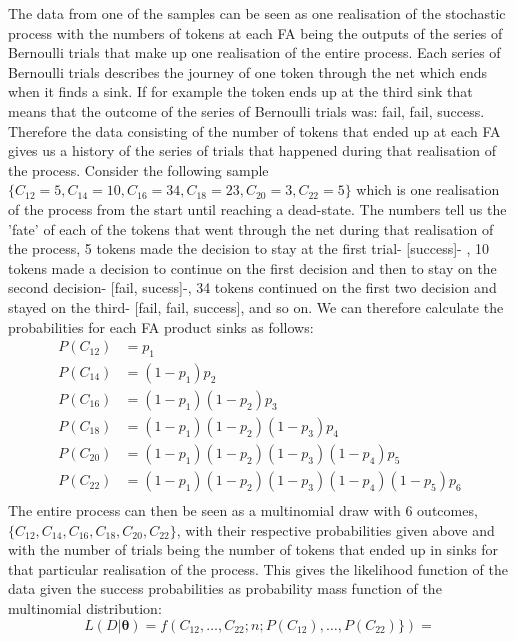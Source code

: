 The data from one of the samples can be seen as one realisation of the
stochastic process with the numbers of tokens at each FA being the
outputs of the series of Bernoulli trials that make up one realisation
of the entire process. Each series of Bernoulli trials describes the
journey of one token through the net which ends when it finds a
sink. If for example the token ends up at the third sink that means
that the outcome of the series of Bernoulli trials was: fail, fail,
success. Therefore the data consisting of the number of tokens that
ended up at each FA gives us a history of the series of trials that
happened during that realisation of the process. Consider the
following sample $\{C_{12}=5, C_{14}=10, C_{16}=34, C_{18}=23,
C_{20}=3, C_{22}=5\}$ which is one realisation of the process from
the start until reaching a dead-state. The numbers tell us the 'fate'
of each of the tokens that went through the net during that
realisation of the process, 5 tokens made the decision to stay at the
first trial- [success]- , 10 tokens made a decision to continue on the
first decision and then to stay on the second decision- [fail,
sucess]-, 34 tokens continued on the first two decision and stayed on
the third- [fail, fail, success], and so on. We can therefore calculate
the probabilities for each FA product sinks as follows:
\begin{align}
P(C_{12}) &= p_1 \nonumber\\
P(C_{14}) &= (1-p_1)p_2 \nonumber\\
P(C_{16}) &= (1-p_1)(1-p_2)p_3 \nonumber \\
P(C_{18}) &= (1-p_1)(1-p_2)(1-p_3)p_4 \nonumber\\
P(C_{20}) &= (1-p_1)(1-p_2)(1-p_3)(1-p_4)p_5 \nonumber\\
P(C_{22}) &= (1-p_1)(1-p_2)(1-p_3)(1-p_4)(1-p_5)p_6 \nonumber\\
\label{eq:param_cor}
\end{align}
The entire process can then be seen as a multinomial draw with 6
outcomes,  $\{C_{12}, C_{14}, C_{16}, C_{18}, C_{20}, C_{22}\}$, with
their respective probabilities given above and with the number of
trials being the number of tokens that ended up in sinks for that
particular realisation of the process. This gives the likelihood
function of the data given the success probabilities as
probability mass function of the multinomial distribution:
\begin{equation*}
L(D|\mathbf{\theta}) = f(C_{12},\dots, C_{22}; n ; P(C_{12}), \dots,
P(C_{22})\}) =
\end{equation*}

